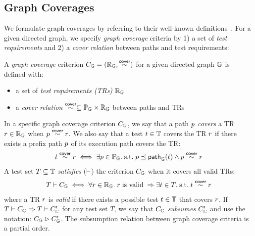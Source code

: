 

\subsection{Graph Coverages}\label{sec:cov}

We formulate graph coverages by referring to their well-known
definitions~\cite{cov-def}.
%
For a given directed graph, we specify \textit{graph coverage} criteria by 1) a
set of \textit{test requirements} and 2) a \textit{cover relation} between paths
and test requirements:


\begin{definition}\label{def:graph-cov}
  A \textit{graph coverage} criterion $C_{\mathbb{G}} = (\mathbb{R}_{\mathbb{G}}, \overset{\textsf{cover}}{\sim})$
  for a given directed graph $\mathbb{G}$ is defined with:
  \begin{itemize}
    \item a set of \textit{test requirements (TRs)} $\mathbb{R}_{\mathbb{G}}$
    \item a \textit{cover relation} $\overset{\textsf{cover}}{\sim} \subseteq \mathbb{P}_{\mathbb{G}} \times
      \mathbb{R}_{\mathbb{G}}$ between paths and TRs
  \end{itemize}
\end{definition}


In a specific graph coverage criterion $C_{\mathbb{G}}$, we say that a path $p$
\textit{covers} a TR $r \in \mathbb{R}_{\mathbb{G}}$ when $p \overset{\textsf{cover}}{\sim}
r$.
%
We also say that a test $t \in \mathbb{T}$ covers the TR $r$ if there exists
a prefix path $p$ of its execution path covers the TR:
%
\begin{equation}\label{equ:test-cover}
  t \overset{\textsf{cover}}{\sim} r
  \iff
  \exists p \in \mathbb{P}_{\mathbb{G}}. {\; \text{s.t.} \; }
  p \preceq \textsf{path}_{\mathbb{G}}(t) \wedge
  p \overset{\textsf{cover}}{\sim} r
\end{equation}
%
A test set $T \subseteq \mathbb{T}$ \textit{satisfies} ($\vdash$) the criterion
$C_{\mathbb{G}}$ when it covers all valid TRs:
\begin{equation}\label{equ:sat}
  T \vdash C_{\mathbb{G}}
  \iff
  \forall r \in \mathbb{R}_{\mathbb{G}}. \;
  r \; \text{is valid} \; \Rightarrow
  \exists t \in T. {\; \text{s.t.} \; } t \overset{\textsf{cover}}{\sim} r
\end{equation}
where a TR $r$ is \textit{valid} if there exists a possible test $t \in
\mathbb{T}$ that covers $r$.
%
If $T \vdash C_{\mathbb{G}} \Rightarrow T \vdash C_{\mathbb{G}}'$ for any test set $T$,
we say that $C_{\mathbb{G}}$ \textit{subsumes} $C_{\mathbb{G}}'$ and use the
notation: $C_{\mathbb{G}} \rhd C_{\mathbb{G}}'$.
%
The subsumption relation between graph coverage criteria is a partial order.

